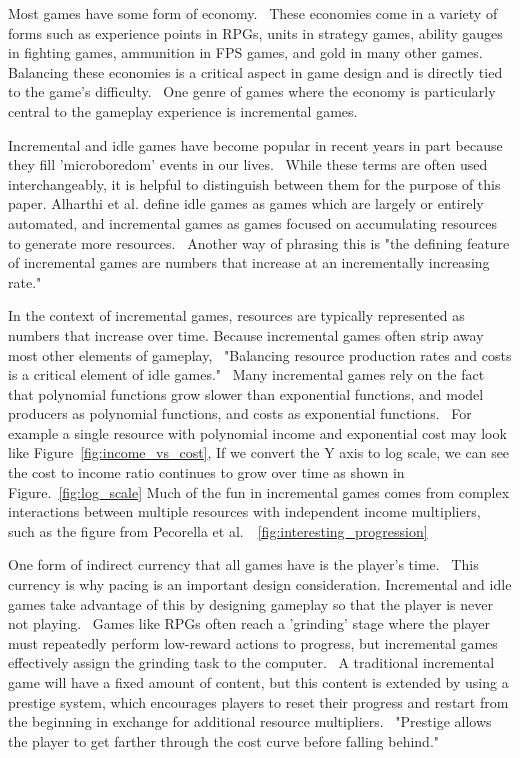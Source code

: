 Most games have some form of economy.~\cite{rogers_using_2023}
These economies come in a variety of forms such as experience points in RPGs, 
units in strategy games, ability gauges in fighting games, ammunition in FPS games, and gold in many other games.
Balancing these economies is a critical aspect in game design and is directly tied to the game's difficulty.~\cite{rogers_using_2023}
One genre of games where the economy is particularly central to the gameplay experience is incremental games.

Incremental and idle games have become popular in recent years in part because they fill 'microboredom' events in our lives.~\cite{alharthi_playing_2018}
While these terms are often used interchangeably, it is helpful to distinguish between them for the purpose of this paper.
Alharthi et al. define idle games as games which are largely or entirely automated, and incremental games as games focused on accumulating resources to generate more resources.~\cite{alharthi_playing_2018}
Another way of phrasing this is "the defining feature of incremental games are numbers that increase at an incrementally increasing rate."~\cite{schmalzer_ontology_2020}

In the context of incremental games, resources are typically represented as numbers that increase over time.
Because incremental games often strip away most other elements of gameplay,~\cite{schmalzer_ontology_2020} "Balancing resource production rates and costs is a critical element of idle games."~\cite{alharthi_playing_2018}
Many incremental games rely on the fact that polynomial functions grow slower than exponential functions, and model producers as polynomial functions, and costs as exponential functions.~\cite{pecorella_math_2016}
For example a single resource with polynomial income and exponential cost may look like Figure~\ref{fig:income_vs_cost},
If we convert the Y axis to log scale, we can see the cost to income ratio continues to grow over time as shown in Figure.~\ref{fig:log_scale}
Much of the fun in incremental games comes from complex interactions between multiple resources with independent income multipliers, such as the figure from Pecorella et al.~\cite{pecorella_math_2016}~\ref{fig:interesting_progression}

One form of indirect currency that all games have is the player's time.~\cite{rupp_geevo_2024}
This currency is why pacing is an important design consideration.
Incremental and idle games take advantage of this by designing gameplay so that the player is never not playing.~\cite{alharthi_playing_2018}
Games like RPGs often reach a 'grinding' stage where the player must repeatedly perform low-reward actions to progress,
but incremental games effectively assign the grinding task to the computer.~\cite{schmalzer_ontology_2020}
A traditional incremental game will have a fixed amount of content, but this content is extended by using a prestige system,
which encourages players to reset their progress and restart from the beginning in exchange for additional resource multipliers.~\cite{alharthi_playing_2018}
"Prestige allows the player to get farther through the cost curve before falling behind."~\cite{pecorella_math_2016}

